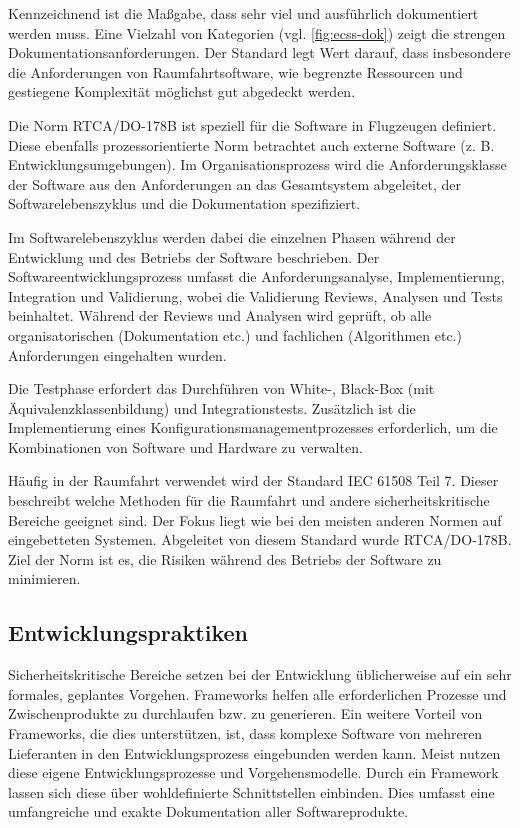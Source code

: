 Kennzeichnend ist die Maßgabe, dass sehr viel und ausführlich dokumentiert werden muss.
Eine Vielzahl von Kategorien (vgl. \autoref{fig:ecss-dok}) zeigt die strengen Dokumentationsanforderungen.
Der Standard legt Wert darauf, dass insbesondere die Anforderungen von Raumfahrtsoftware, wie begrenzte Ressourcen und gestiegene Komplexität möglichst gut abgedeckt werden.
\parencite[Vgl.][]{jones2002introducing}

Die Norm RTCA/DO-178B ist speziell für die Software in Flugzeugen definiert.
Diese ebenfalls prozessorientierte Norm betrachtet auch externe Software (z. B. Entwicklungsumgebungen).
Im Organisationsprozess wird die Anforderungsklasse der Software aus den Anforderungen an das Gesamtsystem abgeleitet, der Softwarelebenszyklus und die Dokumentation spezifiziert.
\parencite[Vgl.][S. 71]{Hohler:1998aa}

Im Softwarelebenszyklus werden dabei die einzelnen Phasen während der Entwicklung und des Betriebs der Software beschrieben.
Der Softwareentwicklungsprozess umfasst die Anforderungsanalyse, Implementierung, Integration und Validierung, wobei die Validierung Reviews, Analysen und Tests beinhaltet.
Während der Reviews und Analysen wird geprüft, ob alle organisatorischen (Dokumentation etc.) und fachlichen (Algorithmen etc.) Anforderungen eingehalten wurden.
\parencite[Vgl.][S. 71]{Hohler:1998aa}

Die Testphase erfordert das Durchführen von White-, Black-Box (mit Äquivalenzklassenbildung) und Integrationstests.
Zusätzlich ist die Implementierung eines Konfigurationsmanagementprozesses erforderlich, um die Kombinationen von Software und Hardware zu verwalten.
\parencite[Vgl.][S. 71]{Hohler:1998aa}

Häufig in der Raumfahrt verwendet wird der Standard IEC 61508 Teil 7.
Dieser beschreibt welche Methoden für die Raumfahrt und andere sicherheitskritische Bereiche geeignet sind.
Der Fokus liegt wie bei den meisten anderen Normen auf eingebetteten Systemen.
Abgeleitet von diesem Standard wurde RTCA/DO-178B.
Ziel der Norm ist es, die Risiken während des Betriebs der Software zu minimieren.
\parencite[Vgl.][S. 40]{Carpenter:2014aa}

\subsection{Entwicklungspraktiken} %

Sicherheitskritische Bereiche setzen bei der Entwicklung üblicherweise auf ein sehr formales, geplantes Vorgehen.
Frameworks helfen alle erforderlichen Prozesse und Zwischenprodukte zu durchlaufen bzw. zu generieren.
Ein weitere Vorteil von Frameworks, die dies unterstützen, ist, dass komplexe Software von mehreren Lieferanten in den Entwicklungsprozess eingebunden werden kann.
Meist nutzen diese eigene Entwicklungsprozesse und Vorgehensmodelle.
Durch ein Framework lassen sich diese über wohldefinierte Schnittstellen einbinden.
Dies umfasst eine umfangreiche und exakte Dokumentation aller Softwareprodukte.
\parencite[Vgl.][S. 39]{Carpenter:2014aa}

